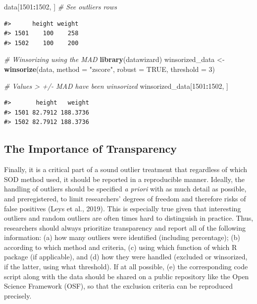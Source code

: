 \documentclass{article}
\newenvironment{Shaded}{\begin{snugshade}}{\end{snugshade}}
\newcommand{\AttributeTok}[1]{\textcolor[rgb]{0.13,0.29,0.53}{#1}}
\newcommand{\CommentTok}[1]{\textcolor[rgb]{0.56,0.35,0.01}{\textit{#1}}}
\newcommand{\ConstantTok}[1]{\textcolor[rgb]{0.56,0.35,0.01}{#1}}
\newcommand{\DecValTok}[1]{\textcolor[rgb]{0.00,0.00,0.81}{#1}}
\newcommand{\FunctionTok}[1]{\textcolor[rgb]{0.13,0.29,0.53}{\textbf{#1}}}
\newcommand{\NormalTok}[1]{#1}
\newcommand{\OtherTok}[1]{\textcolor[rgb]{0.56,0.35,0.01}{#1}}
\newcommand{\SpecialCharTok}[1]{\textcolor[rgb]{0.81,0.36,0.00}{\textbf{#1}}}
\newcommand{\StringTok}[1]{\textcolor[rgb]{0.31,0.60,0.02}{#1}}
\begin{document}
\begin{Shaded}
\begin{Highlighting}[]
\NormalTok{data[}\DecValTok{1501}\SpecialCharTok{:}\DecValTok{1502}\NormalTok{, ]  }\CommentTok{\# See outliers rows}
\end{Highlighting}
\end{Shaded}

\begin{verbatim}
#>      height weight
#> 1501    100    258
#> 1502    100    200
\end{verbatim}

\begin{Shaded}
\begin{Highlighting}[]
\CommentTok{\# Winsorizing using the MAD}
\FunctionTok{library}\NormalTok{(datawizard)}
\NormalTok{winsorized\_data }\OtherTok{\textless{}{-}} \FunctionTok{winsorize}\NormalTok{(data, }\AttributeTok{method =} \StringTok{"zscore"}\NormalTok{, }\AttributeTok{robust =} \ConstantTok{TRUE}\NormalTok{, }\AttributeTok{threshold =} \DecValTok{3}\NormalTok{)}

\CommentTok{\# Values \textgreater{} +/{-} MAD have been winsorized}
\NormalTok{winsorized\_data[}\DecValTok{1501}\SpecialCharTok{:}\DecValTok{1502}\NormalTok{, ]}
\end{Highlighting}
\end{Shaded}

\begin{verbatim}
#>       height   weight
#> 1501 82.7912 188.3736
#> 1502 82.7912 188.3736
\end{verbatim}

\hypertarget{the-importance-of-transparency}{%
\subsection{The Importance of
Transparency}\label{the-importance-of-transparency}}

Finally, it is a critical part of a sound outlier treatment that
regardless of which SOD method used, it should be reported in a
reproducible manner. Ideally, the handling of outliers should be
specified \emph{a priori} with as much detail as possible, and
preregistered, to limit researchers' degrees of freedom and therefore
risks of false positives (Leys et al., 2019). This is especially true
given that interesting outliers and random outliers are often times hard
to distinguish in practice. Thus, researchers should always prioritize
transparency and report all of the following information: (a) how many
outliers were identified (including percentage); (b) according to which
method and criteria, (c) using which function of which R package (if
applicable), and (d) how they were handled (excluded or winsorized, if
the latter, using what threshold). If at all possible, (e) the
corresponding code script along with the data should be shared on a
public repository like the Open Science Framework (OSF), so that the
exclusion criteria can be reproduced precisely.
\end{document}
